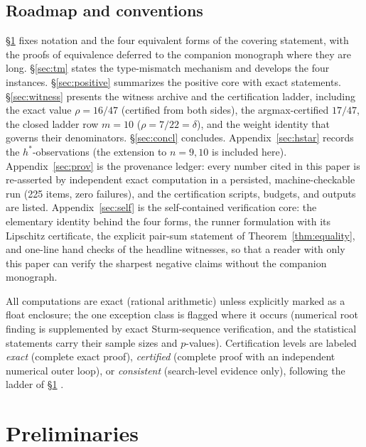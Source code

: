 \documentclass[11pt,a4paper]{article}
\numberwithin{equation}{section}
\theoremstyle{plain}
\theoremstyle{definition}
\theoremstyle{remark}
\begin{document}
\subsection{Roadmap and conventions}

\S\ref{sec:prelim} fixes notation and the four equivalent forms of the
covering statement, with the proofs of equivalence deferred to the
companion monograph where they are long. \S\ref{sec:tm} states the
type-mismatch mechanism and develops the four instances.
\S\ref{sec:positive} summarizes the positive core with exact statements.
\S\ref{sec:witness} presents the witness archive and the certification
ladder, including the exact value $\rho=16/47$ (certified from both
sides), the argmax-certified $17/47$, the closed ladder row $m=10$
($\rho=7/22=\delta$), and
the weight identity that governs their denominators.
\S\ref{sec:concl} concludes. Appendix~\ref{sec:hstar} records the
$h^*$-observations (the extension to $n=9,10$ is included here).
Appendix~\ref{sec:prov} is the provenance ledger: every number cited in
this paper is re-asserted by independent exact computation in a
persisted, machine-checkable run (225 items, zero failures), and the
certification scripts, budgets, and outputs are listed.
Appendix~\ref{sec:self} is the self-contained verification core: the
elementary identity behind the four forms, the runner formulation with
its Lipschitz certificate, the explicit pair-sum statement of
Theorem~\ref{thm:equality}, and one-line hand checks of the headline
witnesses, so that a reader with only this paper can verify the sharpest
negative claims without the companion monograph.

All computations are exact (rational arithmetic) unless explicitly marked
as a float enclosure; the one exception class is flagged where it occurs
(numerical root finding is supplemented by exact Sturm-sequence
verification, and the statistical statements carry their sample sizes and
$p$-values). Certification levels are labeled \emph{exact}
(complete exact proof), \emph{certified} (complete proof with an
independent numerical outer loop), or \emph{consistent} (search-level
evidence only), following the ladder of \S\ref{sec:prelim}
\cite{prog-artifacts}.


\section{Preliminaries}\label{sec:prelim}
\end{document}
